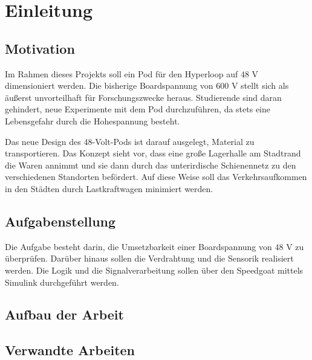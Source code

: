 \chapter{Einleitung}

\section{Motivation}
Im Rahmen dieses Projekts soll ein Pod für den Hyperloop auf $48$ V dimensioniert werden. Die bisherige Boardspannung von 600 V stellt sich als äußerst unvorteilhaft für Forschungszwecke heraus. Studierende sind daran gehindert, neue Experimente mit dem Pod durchzuführen, da stets eine Lebensgefahr durch die Hohespannung besteht.

Das neue Design des 48-Volt-Pods ist darauf ausgelegt, Material zu transportieren. Das Konzept sieht vor, dass eine große Lagerhalle am Stadtrand die Waren annimmt und sie dann durch das unterirdische Schienennetz zu den verschiedenen Standorten befördert. Auf diese Weise soll das Verkehrsaufkommen in den Städten durch Lastkraftwagen minimiert werden.


\section{Aufgabenstellung}

Die Aufgabe besteht darin, die Umsetzbarkeit einer Boardspannung von $48$ V zu überprüfen. Darüber hinaus sollen die Verdrahtung und die Sensorik realisiert werden. Die Logik und die Signalverarbeitung sollen über den Speedgoat mittels Simulink durchgeführt werden.

\section{Aufbau der Arbeit}

\section{Verwandte Arbeiten}

\pagebreak

